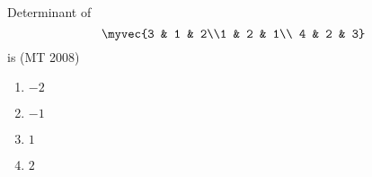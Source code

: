 \item Determinant of $$\myvec{3 & 1 & 2\\1 & 2 & 1\\ 4 & 2 & 3}$$
is
\hfill(MT 2008)
\begin{multicols}{4}
\begin{enumerate}
\item $-2$
\item $-1$ 
\item $1$
\item $2$
\end{enumerate}
\end{multicols}

